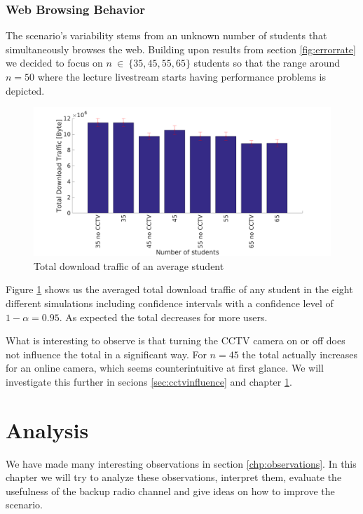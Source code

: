 \documentclass[a4paper]{scrreprt}
\begin{document}
		\subsection{Web Browsing Behavior}\label{sec:http}
			The scenario's variability stems from an unknown number of students that simultaneously browses the web. Building upon results from section \ref{fig:errorrate} we decided to focus on $n~\in~\{35, 45, 55, 65\}$ students so that the range around $n=50$ where the lecture livestream starts having performance problems is depicted.
			
			\begin{figure}[H]
				\center\includegraphics[width=\textwidth]{../Results_Analysis/3rd_analysis/http.png}
				\caption{Total download traffic of an average student}
				\label{fig:http}
			\end{figure}
			
			Figure \ref{fig:http} shows us the averaged total download traffic of any student in the eight different simulations including confidence intervals with a confidence level of $1-\alpha = 0.95$. As expected the total decreases for more users.
			
			What is interesting to observe is that turning the CCTV camera on or off does not influence the total in a significant way. For $n=45$ the total actually increases for an online camera, which seems counterintuitive at first glance. We will investigate this further in secions \ref{sec:cctvinfluence} and chapter \ref{sec:analysis}.					
		
	\chapter{Analysis}\label{sec:analysis}
		We have made many interesting observations in section \ref{chp:observations}. In this chapter we will try to analyze these observations, interpret them, evaluate the usefulness of the backup radio channel and give ideas on how to improve the scenario.				
		
\end{document}
